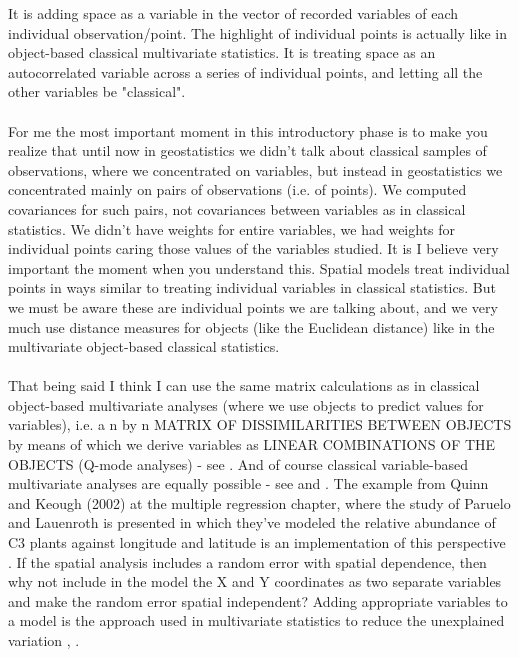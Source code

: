\documentclass {article}
\begin{document}
 It is adding space as a variable in the vector of recorded variables of each individual observation/point. The highlight of individual points is actually like in object-based classical multivariate statistics. It is treating space as an autocorrelated variable across a series of individual points, and letting all the other variables be "classical". 
\\
\\
For me the most important moment in this introductory phase is to make you realize that until now in geostatistics we didn't talk about classical samples of observations, where we concentrated on variables, but instead in geostatistics we concentrated mainly on pairs of observations (i.e. of points). 
We computed covariances for such pairs, not covariances between variables as in classical statistics. We didn't have weights for entire variables, we had weights for individual points caring those values of the variables studied. 
It is I believe very important the moment when you understand this. Spatial models treat individual points in ways similar to treating individual variables in classical statistics. But we must be aware these are individual points we are talking about, and we very much use distance measures for objects (like the Euclidean distance) like in the multivariate object-based classical statistics.
\\
\\
That being said I think I can use the same matrix calculations as in classical object-based multivariate analyses (where we use objects to predict values for variables), i.e. a n by n MATRIX OF DISSIMILARITIES BETWEEN OBJECTS by means of which we derive variables as LINEAR COMBINATIONS OF THE OBJECTS (Q-mode analyses) - see \cite{quinn_experimental_2002}.  
And of course classical variable-based multivariate analyses are equally possible - see \cite{quinn_experimental_2002} and \cite{carroll_mathematical_1997}. 
The example from Quinn and Keough (2002) at the multiple regression chapter, where the study of Paruelo and Lauenroth is presented in which they've modeled the relative abundance of C3 plants against longitude and latitude is an implementation of this perspective \cite{paruelo_relative_1996}.
 If the spatial analysis includes a random error with spatial dependence, then why not include in the model the X and Y coordinates as two separate variables and make the random error spatial independent? Adding appropriate variables to a model is the approach used in multivariate statistics to reduce the unexplained variation \cite{quinn_experimental_2002} , \cite{carroll_mathematical_1997}.
\end{document}
